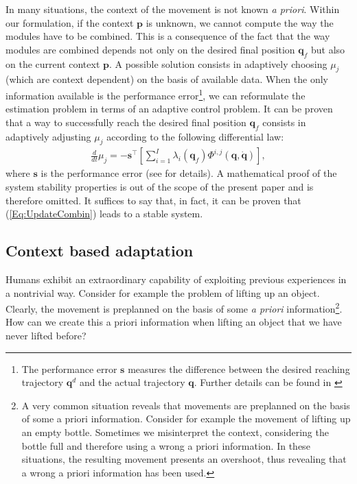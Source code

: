 \documentclass{svmult}
\newcommand{\q}{\mathbf q}
\begin{document}
In many situations, the context of the movement is not known {\em a
priori}. Within our formulation, if the context $\mathbf p$ is
unknown, we cannot compute the way the modules have to be combined.
This is a consequence of the fact that the way modules are combined
depends not only on the desired final position $\mathbf q_f$ but
also on the current context $\mathbf p$. A possible solution
consists in adaptively choosing $\mu_j$ (which are context
dependent) on the basis of available data. When the only information
available is the performance error\footnote{The performance error
$\mathbf s$ measures the difference between the desired reaching
trajectory $\mathbf q^d$ and the actual trajectory $\q$. Further
details can be found in \cite{Kozlowski}}, we can reformulate the
estimation problem in terms of an adaptive control problem. It can
be proven that a way to successfully reach the desired final
position $\mathbf q_f$ consists in adaptively adjusting $\mu_j$
according to the following differential law:
\begin{eqnarray} \label{Eq:UpdateCombin}
\frac{d}{dt}{\mu_j} = - \mathbf s^\top \left[ \sum_{i = 1}^I
\lambda_i(\mathbf q_f) \Phi^{i,j}(\mathbf q, \dot{\mathbf q})
\right],
\end{eqnarray}
where $\mathbf s$ is the performance error (see \cite{Kozlowski} for
details). A mathematical proof of the system stability properties is
out of the scope of the present paper and is therefore omitted. It
suffices to say that, in fact, it can be proven that
(\ref{Eq:UpdateCombin}) leads to a stable system.

\subsection{Context based adaptation}

Humans exhibit an extraordinary capability of exploiting previous
experiences in a nontrivial way. Consider for example the problem of
lifting up an object. Clearly, the movement is preplanned on the
basis of some {\em a priori} information\footnote{A very common
situation reveals that movements are preplanned on the basis of some
a priori information. Consider for example the movement of lifting
up an empty bottle. Sometimes we misinterpret the context,
considering the bottle full and therefore using a wrong a priori
information. In these situations, the resulting movement presents an
overshoot, thus revealing that a wrong a priori information has been
used.}. How can we create this a priori information when lifting an
object that we have never lifted before?
\end{document}
